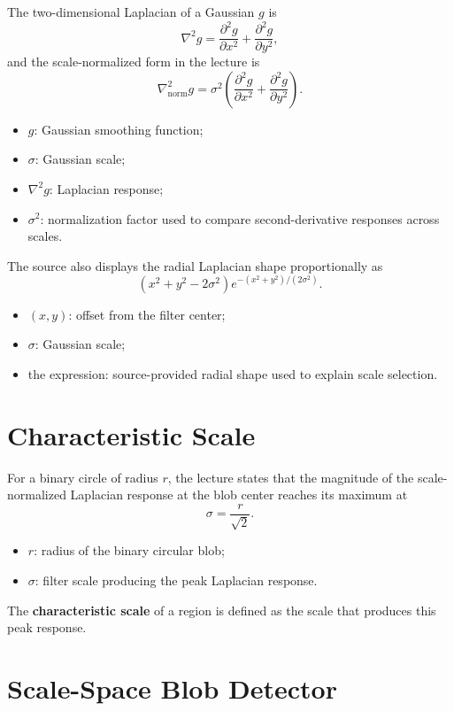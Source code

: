 \documentclass[11pt,a4paper,oneside]{report}
\newcommand{\mathlegend}[1]{%
  \par\vspace{0.2em}{\small\itshape where}\par
  \begin{itemize}[leftmargin=1.7em,topsep=0.15em,itemsep=0.12em]
  #1
  \end{itemize}
}
\begin{document}
The two-dimensional Laplacian of a Gaussian $g$ is
\begin{equation}
  \nabla^2 g=\frac{\partial^2g}{\partial x^2}+\frac{\partial^2g}{\partial y^2},
  \label{eq:log}
\end{equation}
and the scale-normalized form in the lecture is
\begin{equation}
  \nabla^2_{\mathrm{norm}}g
  =\sigma^2\left(
  \frac{\partial^2g}{\partial x^2}+\frac{\partial^2g}{\partial y^2}
  \right).
  \label{eq:normalized-log}
\end{equation}
\mathlegend{
  \item $g$: Gaussian smoothing function;
  \item $\sigma$: Gaussian scale;
  \item $\nabla^2g$: Laplacian response;
  \item $\sigma^2$: normalization factor used to compare second-derivative responses across scales.
}

The source also displays the radial Laplacian shape proportionally as
\begin{equation}
  (x^2+y^2-2\sigma^2)
  e^{-(x^2+y^2)/(2\sigma^2)}.
  \label{eq:log-radial-source}
\end{equation}
\mathlegend{
  \item $(x,y)$: offset from the filter center;
  \item $\sigma$: Gaussian scale;
  \item the expression: source-provided radial shape used to explain scale selection.
}

\section{Characteristic Scale}

For a binary circle of radius $r$, the lecture states that the magnitude of the scale-normalized Laplacian response at the blob center reaches its maximum at
\begin{equation}
  \sigma=\frac{r}{\sqrt{2}}.
  \label{eq:blob-characteristic-scale}
\end{equation}
\mathlegend{
  \item $r$: radius of the binary circular blob;
  \item $\sigma$: filter scale producing the peak Laplacian response.
}
The \textbf{characteristic scale} of a region is defined as the scale that produces this peak response.

\section{Scale-Space Blob Detector}
\end{document}

